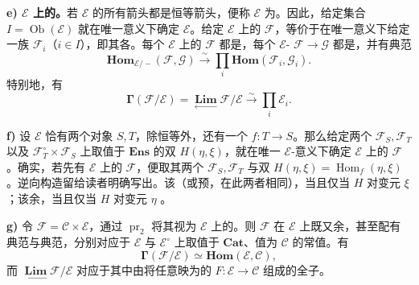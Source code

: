 \textbf{e)  $\mathcal E$ 上的。}若 $\mathcal E$ 的所有箭头都是恒等箭头，便称 $\mathcal E$ 为。因此，给定集合 $I=\operatorname{Ob}(\mathcal E)$ 就在唯一意义下确定 $\mathcal E$。给定 $\mathcal E$ 上的 $\mathcal F$，等价于在唯一意义下给定一族 $\mathcal F_i$（$i\in I$），即其各。每个 $\mathcal E$ 上的 $\mathcal F$ 都是，每个 $\mathcal E$- $\mathcal F\to\mathcal G$ 都是，并有典范
\[
 \mathbf{Hom}_{\mathcal E/-}(\mathcal F,\mathcal G)\xrightarrow{\sim}
 \prod_i\mathbf{Hom}(\mathcal F_i,\mathcal G_i).
\]
特别地，有
\[
 \boldsymbol\Gamma(\mathcal F/\mathcal E)
 =\mathop{\mathbf{Lim}}\limits_{\longleftarrow}\mathcal F/\mathcal E
 \xrightarrow{\sim}\prod_i\mathcal E_i.
\]

\textbf{f)} 设 $\mathcal E$ 恰有两个对象 $S,T$，除恒等外，还有一个 $f:T\to S$。那么给定两个 $\mathcal F_S,\mathcal F_T$ 以及 $\mathcal F_T^\circ\times\mathcal F_S$ 上取值于 $\mathbf{Ens}$ 的双 $H(\eta,\xi)$，就在唯一 $\mathcal E$-意义下确定 $\mathcal E$ 上的 $\mathcal F$。确实，若先有 $\mathcal E$ 上的 $\mathcal F$，便取其两个 $\mathcal F_S,\mathcal F_T$ 与双 $H(\eta,\xi)=\operatorname{Hom}_f(\eta,\xi)$。逆向构造留给读者明确写出。该（或预，在此两者相同），当且仅当 $H$ 对变元 $\xi$ ；该余，当且仅当 $H$ 对变元 $\eta$ 。

\textbf{g)} 令 $\mathcal F=\mathcal C\times\mathcal E$，通过 $\operatorname{pr}_2$ 将其视为 $\mathcal E$ 上的。则 $\mathcal F$ 在 $\mathcal E$ 上既又余，甚至配有典范与典范，分别对应于 $\mathcal E$ 与 $\mathcal E^\circ$ 上取值于 $\mathbf{Cat}$、值为 $\mathcal C$ 的常值。有
\[
 \boldsymbol\Gamma(\mathcal F/\mathcal E)\simeq\mathbf{Hom}(\mathcal E,\mathcal C),
\]
而 $\mathop{\mathbf{Lim}}\limits_{\longleftarrow}\mathcal F/\mathcal E$ 对应于其中由将任意映为的 $F:\mathcal E\to\mathcal C$ 组成的全子。


